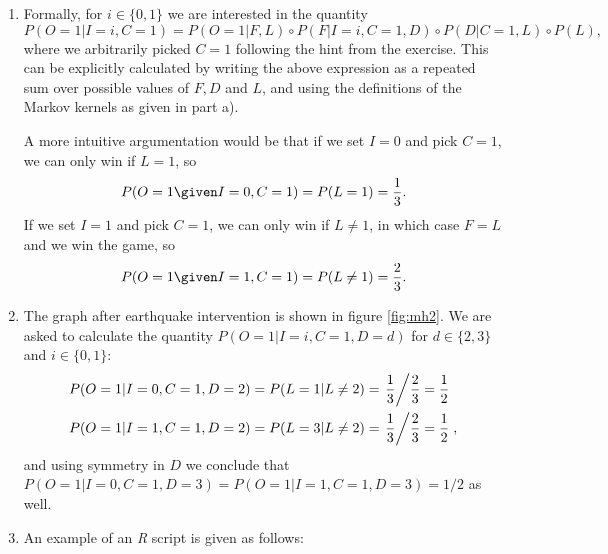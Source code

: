 \begin{enumerate}
\begin{gradedsolution}
\begin{enumerate}
      \item {}
      Formally, for $i\in\{0,1\}$ we are interested in the quantity
      \begin{equation*}
        P(O=1|I=i, C=1) = P(O=1 | F, L)\circ P(F|I=i, C=1, D)\circ P(D|C=1, L)\circ P(L),
      \end{equation*}
      where we arbitrarily picked $C=1$ following the hint from the exercise. This can be explicitly calculated by writing the above expression as a repeated sum over possible values of $F, D$ and $L$, and using the definitions of the Markov kernels as given in part a).

      A more intuitive argumentation would be that if we set $I=0$ and pick $C=1$, we can only win if $L=1$, so
      \begin{equation*}
        P(O =1 \given I=0, C=1) = P(L=1) = \frac{1}{3}.
      \end{equation*}
      If we set $I=1$ and pick $C=1$, we can only win if $L\neq 1$, in which case $F=L$ and we win the game, so
      \begin{equation*}
        P(O =1 \given I=1, C=1) = P(L\neq 1) = \frac{2}{3}.
      \end{equation*}

      \item {}
      The graph after earthquake intervention is shown in figure \ref{fig:mh2}.
      We are asked to calculate the quantity $P(O=1|I=i, C=1, D=d)$ for $d\in\{2, 3\}$ and $i\in\{0,1\}$:
      \begin{align*}
        P(O=1|I=0, C=1, D=2) & = P(L=1|L\neq 2) = \left.\frac{1}{3}\middle/ \frac{2}{3} = \frac{1}{2}\right.  \\
        P(O=1|I=1, C=1, D=2) & = P(L=3|L\neq 2) = \left.\frac{1}{3} \middle/ \frac{2}{3} = \frac{1}{2}\right.,
      \end{align*}
      and using symmetry in $D$ we conclude that $P(O=1|I=0, C=1, D=3) = P(O=1|I=1, C=1, D=3) = 1/2$ as well.

    \item {} An example of an \emph{R} script is given as follows:
    \end{enumerate}
  \end{gradedsolution}


\end{enumerate}
